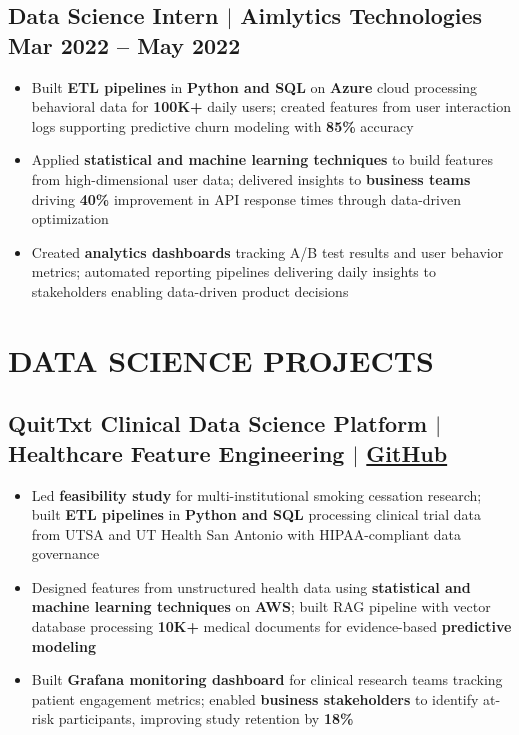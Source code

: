 \documentclass[10pt,letterpaper]{article}
\begin{document}
\subsection{Data Science Intern $|$ Aimlytics Technologies \hfill Mar 2022 -- May 2022}
{\small
\begin{itemize}
    \item Built \textbf{ETL pipelines} in \textbf{Python and SQL} on \textbf{Azure} cloud processing behavioral data for \textbf{100K+} daily users; created features from user interaction logs supporting predictive churn modeling with \textbf{85\%} accuracy
    \item Applied \textbf{statistical and machine learning techniques} to build features from high-dimensional user data; delivered insights to \textbf{business teams} driving \textbf{40\%} improvement in API response times through data-driven optimization
    \item Created \textbf{analytics dashboards} tracking A/B test results and user behavior metrics; automated reporting pipelines delivering daily insights to stakeholders enabling data-driven product decisions
\end{itemize}}

\section{DATA SCIENCE PROJECTS}

\subsection{QuitTxt Clinical Data Science Platform $|$ Healthcare Feature Engineering $|$ \href{https://github.com/anudeepadi/quitxt}{GitHub}}
{\small
\begin{itemize}
    \item Led \textbf{feasibility study} for multi-institutional smoking cessation research; built \textbf{ETL pipelines} in \textbf{Python and SQL} processing clinical trial data from UTSA and UT Health San Antonio with HIPAA-compliant data governance
    \item Designed features from unstructured health data using \textbf{statistical and machine learning techniques} on \textbf{AWS}; built RAG pipeline with vector database processing \textbf{10K+} medical documents for evidence-based \textbf{predictive modeling}
    \item Built \textbf{Grafana monitoring dashboard} for clinical research teams tracking patient engagement metrics; enabled \textbf{business stakeholders} to identify at-risk participants, improving study retention by \textbf{18\%}
\end{itemize}}
\end{document}
